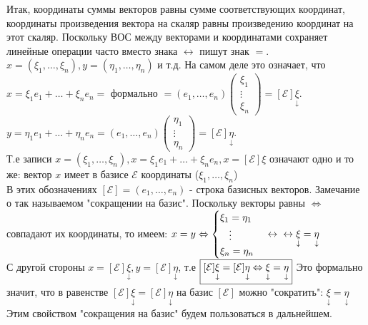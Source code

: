 \documentclass[../main.tex]{subfiles}
\begin{document}
Итак, координаты суммы векторов равны сумме соответствующих координат, координаты произведения вектора на скаляр равны произведению координат на этот скаляр. Поскольку ВОС между векторами и координатами сохраняет линейные операции часто вместо знака $\leftrightarrow$ пишут знак $=$.
\\$x= (\xi_{1},\dots,\xi_{n}), y = (\eta_{1},\dots,\eta_{n})$ и т.д. На самом деле это означает, что $x= \xi_{1}e_{1}+\dots+\xi_{n}e_{n} =$ формально $=(e_{1},\dots,e_{n})\begin{pmatrix}
    \xi_{1}\\
    \vdots\\
    \xi_{n}
\end{pmatrix}= [\mathcal{E}]\underset{\downarrow}{\xi}$. 
\\$y= \eta_{1}e_{1}+\dots+\eta_{n}e_{n} = (e_{1},\dots,e_{n})\begin{pmatrix}
    \eta_{1}\\
    \vdots\\
    \eta_{n}
\end{pmatrix}= [\mathcal{E}]\underset{\downarrow}{\eta}$.
\\Т.е записи $x= (\xi_{1},\dots,\xi_{n}), x = \xi_{1}e_{1}+\dots+\xi_{n}e_{n}, x= [\mathcal{E}]\xi$ означают одно и то же: вектор $x$ имеет в базисе $\mathcal{E}$ координаты ($\xi_{1},\dots,\xi_{n}$)
\\В этих обозначениях $[\mathcal{E}]= (e_{1},\dots,e_{n})$ - строка базисных векторов. 
Замечание о так называемом "сокращении на базис". Поскольку векторы равны $\Leftrightarrow$ совпадают их координаты, то имеем: $x=y \Leftrightarrow \begin{cases}
    \xi_{1} = \eta_{1}\\
    \phantom{\xi_{1}} \vdots\\
    \xi_{n} = \eta_{n}
\end{cases} \leftrightarrow \\\leftrightarrow \underset{\downarrow}{\xi}= \underset{\downarrow}{\eta}$
\\С другой стороны $x = [\mathcal{E}]\underset{\downarrow}{\xi}, y = [\mathcal{E}]\underset{\downarrow}{\eta}$, т.е $\fbox{$[\mathcal{E}] \underset{\downarrow}{\xi} = [\mathcal{E}]\underset{\downarrow}{\eta} \Leftrightarrow \underset{\downarrow}{\xi} = \underset{\downarrow}{\eta}$}$ Это формально значит, что в равенстве $[\mathcal{E}]\underset{\downarrow}{\xi} = [\mathcal{E}]\underset{\downarrow}{\eta}$ на базис $[\mathcal{E}]$ можно "сократить": $\underset{\downarrow}{\xi}= \underset{\downarrow}{\eta}$
\\Этим свойством "сокращения на базис" будем пользоваться в дальнейшем.
\end{document}
